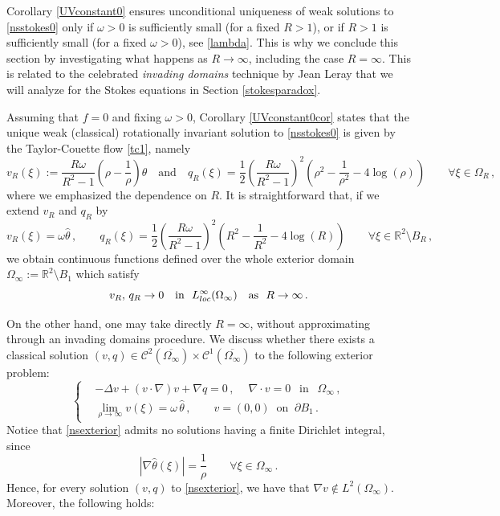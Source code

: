 \documentclass[a4paper,11pt]{article}
\numberwithin{equation}{section}
\numberwithin{figure}{section}
\newcommand{\R}{\mathbb{R}}
\begin{document}
Corollary \ref{UVconstant0} ensures unconditional uniqueness
of weak solutions to \eqref{nsstokes0} only if $\omega>0$ is sufficiently small (for a fixed $R>1$), or if $R > 1$ is sufficiently small
(for a fixed $\omega>0$), see \eqref{lambda}. This is why we conclude this section by investigating what happens as $R\to\infty$, including the case $R=\infty$.
This is related to the celebrated \textit{invading domains} technique by Jean Leray \cite{leray1933etude} that we will analyze for the Stokes equations in Section \ref{stokesparadox}.
\par
Assuming that $f=0$ and fixing $\omega>0$, Corollary \ref{UVconstant0cor} states that the unique weak (classical) rotationally
invariant solution to \eqref{nsstokes0} is given by the Taylor-Couette flow \eqref{tc1}, namely
$$
v_R(\xi) := \dfrac{R \omega}{R^2 - 1} \left( \rho - \dfrac{1}{\rho} \right) \widehat{\theta} \quad \text{and} \quad q_R(\xi)=
\dfrac{1}{2}\left(\dfrac{R \omega}{R^2 - 1}\right)^{2}\left(\rho^{2}-\dfrac{1}{\rho^{2}}-4\log(\rho)\right)\qquad\forall\xi\in\Omega_{R}\, ,
$$
where we emphasized the dependence on $R$. It is straightforward that, if we extend $v_R$ and $q_R$ by
$$v_R(\xi) = \omega\widehat{\theta}\, ,\qquad q_R(\xi) = \dfrac{1}{2} \left( \dfrac{R \omega}{R^2 - 1} \right)^{2}
\left(R^{2}-\dfrac{1}{R^{2}}-4\log(R)\right)\qquad \forall \xi \in \R^2 \setminus B_{R} \, ,$$
we obtain continuous functions defined over the whole exterior domain $\Omega_{\infty} := \R^2\setminus B_1$ which satisfy
$$
v_R, \, q_R\to0\quad\mbox{in } \ L^\infty_{\rm loc}(\Omega_\infty)\quad\mbox{as } \ R\to\infty\, .
$$

On the other hand, one may take directly $R=\infty$, without approximating through an invading domains procedure. We discuss
whether there exists a classical solution $(v,q)\in\mathcal{C}^{2}(\overline{\Omega_{\infty}}) \times \mathcal{C}^{1}(\overline{\Omega_{\infty}})$
to the following exterior problem:
\begin{equation}\label{nsexterior}
\left\{
\begin{aligned}
	& -\Delta v+ (v \cdot \nabla)v +  \nabla q=0 \, ,\ \quad  \nabla\cdot v=0 \ \ \mbox{ in } \ \ \Omega_{\infty}\, ,
\\[3pt]
	& \lim\limits_{\rho \to \infty} v(\xi) = \omega \, \widehat{\theta}\, , \qquad v = (0,0) \ \text{ on } \ \partial B_{1} \, .
\end{aligned}
\right.
\end{equation}
Notice that \eqref{nsexterior} admits no solutions having a finite Dirichlet integral, since
$$
| \nabla \widehat{\theta}(\xi)|=\dfrac{1}{\rho}\qquad\forall \xi \in \Omega_{\infty} \, .
$$
Hence, for every solution $(v,q)$ to \eqref{nsexterior}, we have that $\nabla v \notin L^{2}(\Omega_{\infty})$. Moreover, the
following holds:
\end{document}
